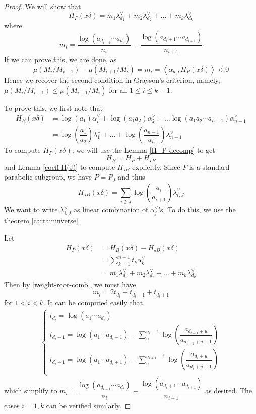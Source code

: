 \begin{proof}
    We will show that
    \[H_P(x\delta ) =m_1\lambda^\vee_{d_1}+m_2\lambda^\vee_{d_2}+\ldots+m_k\lambda^\vee_{d_k}\]
    where
    \[m_i = \dfrac{\log(a_{d_{i-1}}\cdots a_{d_i})}{n_i}-\dfrac{\log(a_{d_i+1}\cdots a_{d_{i+1}})}{n_{i+1}}\]
    If we can prove this, we are done, as
    \[ \mu(M_i/M_{i-1})-\mu(M_{i+1}/M_i)= m_i =\left\langle\alpha_{d_i},H_P(x\delta) \right\rangle < 0\]
    Hence we recover the second condition in Grayson's criterion, namely, $\mu(M_i/M_{i-1}) \le \mu(M_{i+1}/M_i)$ for all $1 \le i \le k-1$.

    To prove this, we first note that
    \begin{align*}
        H_B(x\delta) & =  \log(a_1)\alpha_i^\vee+\log(a_1a_2)\alpha_2^\vee+\ldots \log(a_1a_2\cdots a_{n-1})\alpha_{n-1}^\vee             \\
                     & = \log\left(\dfrac{a_1}{a_2}\right)\lambda_1^\vee+\ldots + \log\left(\dfrac{a_{n-1}}{a_n}\right)\lambda_{n-1}^\vee
    \end{align*}
    To compute $H_P(x\delta)$, we will use the Lemma \ref{H_P-decomp} to get
    \[H_B =H_P + H_{\star B}\]
    and Lemma \ref{coeff-H(J)} to compute $H_{\star B}$ explicitly. Since $P$ is a standard parabolic
    subgroup, we have $P=P_J$ and thus
    \[H_{\star B}(x\delta) = \sum_{i \notin J} \log\left(\dfrac{a_i}{a_{i+1}}\right)\lambda_{i,J}^\vee\]
    We want to write $\lambda_{i,J}^\vee$ as linear combination of $\alpha_j^\vee$'s. To do this, we use
    the theorem \ref{cartaininverse}.

    Let
    \begin{align*}
        H_P(x\delta) & = H_B(x\delta) - H_{\star B}(x\delta)                                     \\
                     & = \sum_{k=1}^{n-1}t_k\alpha_k^\vee                                        \\
                     & =m_1\lambda^\vee_{d_1}+m_2\lambda^\vee_{d_2}+\ldots+m_k\lambda^\vee_{d_k}
    \end{align*}
    Then by \ref{weight-root-comb}, we must have
    \[m_i = 2t_{d_i}-t_{d_{i}-1}+t_{d_i+1}\]
    for $1<i<k$. It can be computed easily that
    \begin{align*}
        \begin{cases}\displaystyle
            t_{d_i} = \log(a_1\cdots a_{d_i})                                                                             \\
            t_{d_i-1} = \log(a_1\cdots a_{d_i-1})-\sum_{u}^{n_i-1}\log\left(\dfrac{a_{d_{i-1}+u}}{a_{d_{i-1}+u+1}}\right) \\
            t_{d_i+1}= \log(a_1\cdots a_{d_i+1})-\sum_{u}^{n_{i+1}-1}\log\left(\dfrac{a_{d_{i}+u}}{a_{d_{i}+u+1}}\right)  \\
        \end{cases}
    \end{align*}
    which simplify to $m_i = \dfrac{\log(a_{d_{i-1}}\cdots a_{d_i})}{n_i}-\dfrac{\log(a_{d_i+1}\cdots a_{d_{i+1}})}{n_{i+1}}$ as desired.
    The cases $i=1,k$  can be verified similarly.


\end{proof}
